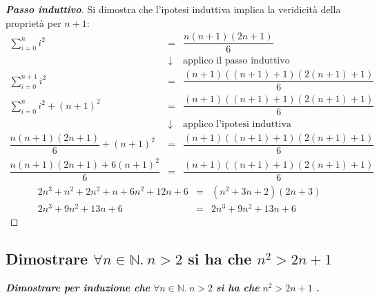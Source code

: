 \documentclass[a4paper]{article}
\begin{document}
	\begin{proof}[\textbf{Passo induttivo}]
		Si dimostra che l'ipotesi induttiva implica la veridicità della proprietà per $n+1$:
		\begin{equation*}
			\begin{array}{rcl}
				\displaystyle\sum_{i=0}^{n} i^{2} &=& \dfrac{n\left(n+1\right)\left(2n+1\right)}{6} \\ [1.5 em]
				&\downarrow& \text{applico il passo induttivo} \\ [1.5em]
				\displaystyle\sum_{i=0}^{n+1} i^{2} &=& \dfrac{\left(n+1\right)\left(\left(n+1\right)+1\right)\left(2 \left(n+1\right)+1\right)}{6} \\ [1.5 em]
				\displaystyle\sum_{i=0}^{n} i^{2} + \left(n+1\right)^{2} &=& \dfrac{\left(n+1\right)\left(\left(n+1\right)+1\right)\left(2 \left(n+1\right)+1\right)}{6} \\ [1.5em]
				&\downarrow& \text{applico l'ipotesi induttiva} \\ [1.5em]
				\dfrac{n\left(n+1\right)\left(2n+1\right)}{6} + \left(n+1\right)^{2} &=& \dfrac{\left(n+1\right)\left(\left(n+1\right)+1\right)\left(2 \left(n+1\right)+1\right)}{6} \\ [1.5em]
				\dfrac{n\left(n+1\right)\left(2n+1\right) + 6\left(n+1\right)^{2}}{6} &=& \dfrac{\left(n+1\right)\left(\left(n+1\right)+1\right)\left(2 \left(n+1\right)+1\right)}{6}
			\end{array}
		\end{equation*}\newpage
		\begin{equation*}
			\begin{array}{rcl}
				2n^{3} + n^{2} + 2n^{2} + n +6n^{2} + 12n + 6
				&=&
				\left(n^{2} + 3n + 2\right)\left(2n + 3\right) \\ [1.5em]
				2n^{3} + 9n^{2} + 13n + 6 &=& 2n^{3} + 9n^{2} + 13n + 6
			\end{array}
		\end{equation*}
	\end{proof}\newpage
	
	\subsection{Dimostrare $\forall n \in \mathbb{N}. \: n > 2$ si ha che $n^{2} > 2n + 1$}
	
	\textcolor{Red3}{\textbf{\emph{Dimostrare per induzione che }}$\forall n \in \mathbb{N}. \: n > 2$ \textbf{\emph{si ha che}} $n^{2} > 2n + 1$ \textbf{\emph{.}}}\newline
	
\end{document}
